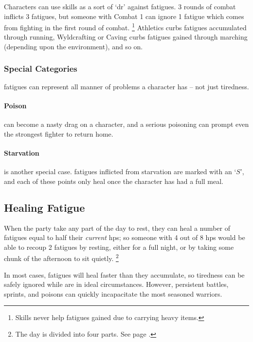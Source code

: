 \begin{multicols}{2}
Characters can use skills as a sort of `\gls{dr}' against \glspl{fatigue}.
3 \glspl{round} of combat inflicts 3 \glspl{fatigue}, but someone with Combat 1 can ignore 1 \gls{fatigue} which comes from fighting in the first round of combat.%
\footnote{Skills never help \glspl{fatigue} gained due to carrying heavy items.}
Athletics curbs \glspl{fatigue} accumulated through running, Wyldcrafting or Caving curbs \glspl{fatigue} gained through marching (depending upon the environment), and so on.

\subsubsection{Special Categories}

\Glspl{fatigue} can represent all manner of problems a character has -- not just tiredness.

\paragraph{Poison} can become a nasty drag on a character, and a serious poisoning can prompt even the strongest fighter to return home.

\paragraph{Starvation} is another special case.
\glspl{fatigue} inflicted from starvation are marked with an `$S$', and each of these points only heal once the character has had a full meal.

\subsection{Healing Fatigue}

When the party take any part of the day to rest, they can heal a number of \glspl{fatigue} equal to half their \textit{current} \glspl{hp}; so someone with 4 out of 8 \glspl{hp} would be able to recoup 2 \glspl{fatigue} by resting, either for a full night, or by taking some chunk of the afternoon to sit quietly.%
\footnote{The day is divided into four parts. See page \pageref{time}.}

In most cases, \glspl{fatigue} will heal faster than they accumulate, so tiredness can be safely ignored while are in ideal circumstances.
However, persistent battles, sprints, and poisons can quickly incapacitate the most seasoned warriors.

\fatiguechart

\end{multicols}

